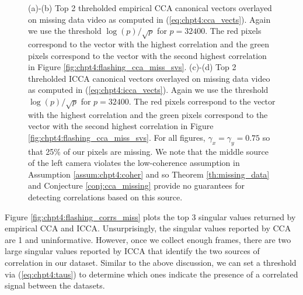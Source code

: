 \begin{figure}
\begin{center}
{    }
    \caption{(a)-(b) Top 2 threholded empirical CCA canonical vectors overlayed on missing
      data video as computed in (\ref{eq:chpt4:cca_vects}). Again we use the threshold
      $\log(p)/\sqrt{p}$ for $p=32400$. The red pixels correspond to the vector with the
      highest correlation and the green pixels correspond to the vector with the second
      highest correlation in Figure \ref{fig:chpt4:flashing_cca_miss_svs}. (c)-(d) Top 2
      threholded ICCA canonical vectors overlayed on missing data video as computed in
      (\ref{eq:chpt4:icca_vects}). Again we use the threshold $\log(p)/\sqrt{p}$ for
      $p=32400$. The red pixels correspond to the vector with the highest correlation and
      the green pixels correspond to the vector with the second highest correlation in
      Figure \ref{fig:chpt4:flashing_cca_miss_svs}. For all figures,
      $\gamma_x=\gamma_y=0.75$ so that 25\% of our pixels are missing. We note that the
      middle source of the left camera violates the low-coherence assumption in Assumption
      \ref{assum:chpt4:coher} and so Theorem \ref{th:missing_data} and Conjecture
      \ref{conj:cca_missing} provide no guarantees for detecting correlations based on
      this source. }
    \label{fig:chpt4:flashing_cca_miss}
  \end{center}
\end{figure}

Figure \ref{fig:chpt4:flashing_corrs_miss} plots the top 3 singular values returned by
empirical CCA and ICCA. Unsurprisingly, the singular values reported by CCA are 1 and
uninformative. However, once we collect enough frames, there are two large singular values reported
by ICCA that identify the two sources of correlation in our dataset. Similar to the above
discussion, we can set a threshold via (\ref{eq:chpt4:taus}) to determine which ones
indicate the presence of a correlated signal between the datasets.

